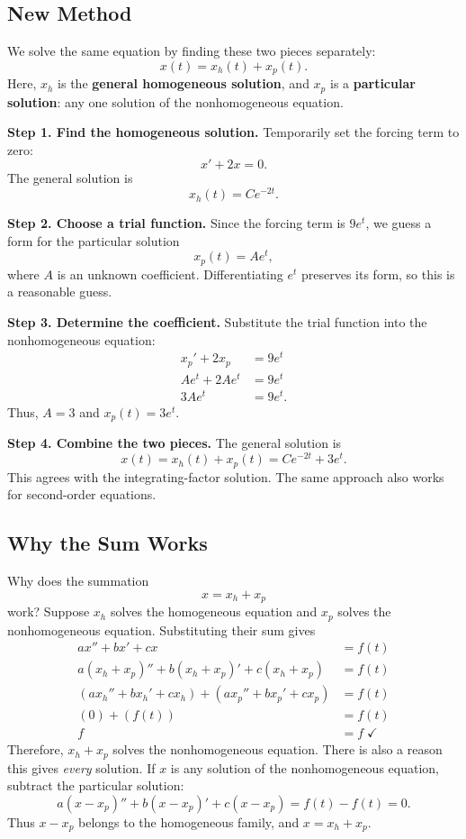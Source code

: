 \documentclass[10pt,letterpaper]{article}
\begin{document}
\subsection{New Method}

We solve the same equation by finding these two pieces
separately:
\[
x(t)=x_h(t)+x_p(t).
\]
Here, $x_h$ is the \textbf{general homogeneous solution},
and $x_p$ is a \textbf{particular solution}: any one
solution of the nonhomogeneous equation.

\par\medskip
\textbf{Step 1. Find the homogeneous solution.}
Temporarily set the forcing term to zero:
\[
x'+2x=0.
\]
The general solution is
\[
x_h(t)=Ce^{-2t}.
\]

\par\medskip
\textbf{Step 2. Choose a trial function.}
Since the forcing term is $9e^t$, we guess a form for the particular solution
\[
x_p(t)=Ae^t,
\]
where $A$ is an unknown coefficient. Differentiating $e^t$
preserves its form, so this is a reasonable guess.

\par\medskip
\textbf{Step 3. Determine the coefficient.}
Substitute the trial function into the nonhomogeneous equation:
\begin{align*}
x_p'+2x_p&=9e^t\\
Ae^t+2Ae^t&=9e^t\\
3Ae^t&=9e^t.
\end{align*}
Thus, $A=3$ and $x_p(t)=3e^t$.

\par\medskip
\textbf{Step 4. Combine the two pieces.}
The general solution is
\[
\boxed{x(t)=x_h(t)+x_p(t)=Ce^{-2t}+3e^t.}
\]
This agrees with the integrating-factor solution.
The same approach also works for second-order equations.

\subsection{Why the Sum Works}
Why does the summation 
$$
    x=x_h+x_p
$$
work?
Suppose $x_h$ solves the homogeneous equation and $x_p$
solves the nonhomogeneous equation. Substituting their sum gives
\begin{align*}
ax''+bx'+cx&=f(t)\\
a(x_h+x_p)''+b(x_h+x_p)'+c(x_h+x_p)&=f(t)\\
(ax_h''+bx_h'+cx_h)+(ax_p''+bx_p'+cx_p)&=f(t)\\
(0)+(f(t))&=f(t)\\
f&=f \; \checkmark
\end{align*}
Therefore, $x_h+x_p$ solves the nonhomogeneous equation. There is also a reason this gives \emph{every} solution. If $x$ is any
solution of the nonhomogeneous equation, subtract the particular solution:
\[
a(x-x_p)''+b(x-x_p)'+c(x-x_p)=f(t)-f(t)=0.
\]
Thus $x-x_p$ belongs to the homogeneous family, and $x=x_h+x_p$.
\end{document}
